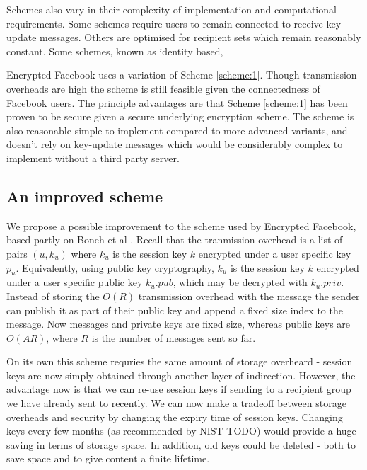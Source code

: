 Schemes also vary in their complexity of implementation and computational requirements. Some schemes require users to remain connected to receive key-update messages. Others are optimised for recipient sets which remain reasonably constant. Some schemes, known as identity based, 

Encrypted Facebook uses a variation of Scheme \ref{scheme:1}. Though transmission overheads are high the scheme is still feasible given the connectedness of Facebook users. The principle advantages are that Scheme \ref{scheme:1} has been proven to be secure given a secure underlying encryption scheme. The scheme is also reasonable simple to implement compared to more advanced variants, and doesn't rely on key-update messages which would be considerably complex to implement without a third party server.

\subsection{An improved scheme}
\label{ssec:bcast-improved}

We propose a possible improvement to the scheme used by Encrypted Facebook, based partly on Boneh et al \cite{boneh}. Recall that the tranmission overhead is a list of pairs $(u, k_u)$ where $k_u$ is the session key $k$ encrypted under a user specific key $p_u$. Equivalently, using public key cryptography, $k_u$ is the session key $k$ encrypted under a user specific public key $k_u.pub$, which may be decrypted with $k_u.priv$. Instead of storing the $O(R)$ transmission overhead with the message the sender can publish it as part of their public key and append a fixed size index to the message. Now messages and private keys are fixed size, whereas public keys are $O(AR)$, where $R$ is the number of messages sent so far. 

On its own this scheme requries the same amount of storage overheard - session keys are now simply obtained through another layer of indirection. However, the advantage now is that we can re-use session keys if sending to a recipient group we have already sent to recently. We can now make a tradeoff between storage overheads and security by changing the expiry time of session keys. Changing keys every few months (as recommended by NIST TODO) would provide a huge saving in terms of storage space. In addition, old keys could be deleted - both to save space and to give content a finite lifetime.